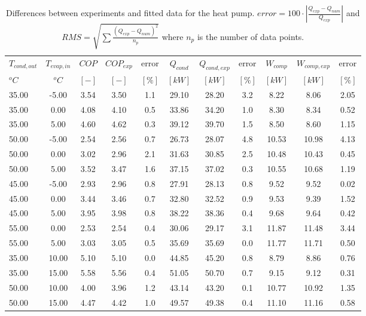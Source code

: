 \documentclass[english]{SPFShortReport}
\begin{document}
\begin{table}[!ht]
\begin{small}
\caption{Differences between experiments and fitted data for the heat pump.          $error=100 \cdot |\frac{Q_{exp}-Q_{num}}{Q_{exp}}|$ and $RMS = \sqrt { \sum{\frac{(Q_{exp}-Q_{num})^2}{n_p}} }$ where $n_p$ is the number of data points.}
\begin{center}
\resizebox{12cm}{!} 
{
\begin{tabular}{l | c c c c c c c c c c } 
\hline
\hline
$T_{cond,out}$ &$T_{evap,in}$ &$COP$ &$COP_{exp}$ &error &$Q_{cond}$ &$Q_{cond,exp}$ &error &$W_{comp}$ &$W_{comp,exp}$ &error \\ 
$^oC$ &$^oC$ &$[-]$ &$[-]$ &$[\%]$ &$[kW]$ &$[kW]$ &$[\%]$ &$[kW]$ &$[kW]$ &$[\%]$\\ 
\hline
35.00  & -5.00 & 3.54 & 3.50 & 1.1 & 29.10 & 28.20 & 3.2 & 8.22 & 8.06 & 2.05\\ 
35.00  & 0.00 & 4.08 & 4.10 & 0.5 & 33.86 & 34.20 & 1.0 & 8.30 & 8.34 & 0.52\\ 
35.00  & 5.00 & 4.60 & 4.62 & 0.3 & 39.12 & 39.70 & 1.5 & 8.50 & 8.60 & 1.15\\ 
50.00  & -5.00 & 2.54 & 2.56 & 0.7 & 26.73 & 28.07 & 4.8 & 10.53 & 10.98 & 4.13\\ 
50.00  & 0.00 & 3.02 & 2.96 & 2.1 & 31.63 & 30.85 & 2.5 & 10.48 & 10.43 & 0.45\\ 
50.00  & 5.00 & 3.52 & 3.47 & 1.6 & 37.15 & 37.02 & 0.3 & 10.55 & 10.68 & 1.19\\ 
45.00  & -5.00 & 2.93 & 2.96 & 0.8 & 27.91 & 28.13 & 0.8 & 9.52 & 9.52 & 0.02\\ 
45.00  & 0.00 & 3.44 & 3.46 & 0.7 & 32.80 & 32.52 & 0.9 & 9.53 & 9.39 & 1.52\\ 
45.00  & 5.00 & 3.95 & 3.98 & 0.8 & 38.22 & 38.36 & 0.4 & 9.68 & 9.64 & 0.42\\ 
55.00  & 0.00 & 2.53 & 2.54 & 0.4 & 30.06 & 29.17 & 3.1 & 11.87 & 11.48 & 3.44\\ 
55.00  & 5.00 & 3.03 & 3.05 & 0.5 & 35.69 & 35.69 & 0.0 & 11.77 & 11.71 & 0.50\\ 
35.00  & 10.00 & 5.10 & 5.10 & 0.0 & 44.85 & 45.20 & 0.8 & 8.79 & 8.86 & 0.76\\ 
35.00  & 15.00 & 5.58 & 5.56 & 0.4 & 51.05 & 50.70 & 0.7 & 9.15 & 9.12 & 0.31\\ 
50.00  & 10.00 & 4.00 & 3.96 & 1.2 & 43.14 & 43.20 & 0.1 & 10.77 & 10.92 & 1.35\\ 
50.00  & 15.00 & 4.47 & 4.42 & 1.0 & 49.57 & 49.38 & 0.4 & 11.10 & 11.16 & 0.58\\ 

\end{tabular}}
\end{center}
\end{small}
\end{table}
\end{document}
